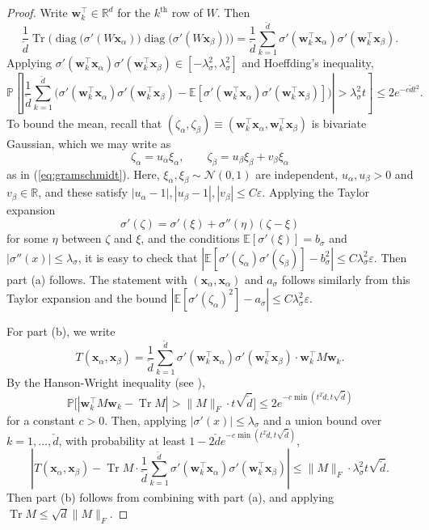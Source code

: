 \documentclass{article}
\theoremstyle{definition}
\newcommand{\R}{\mathbb{R}}
\newcommand{\N}{\mathcal{N}}
\newcommand{\E}{\mathbb{E}}
\newcommand{\Tr}{\operatorname{Tr}}
\newcommand{\x}{\mathbf{x}}
\newcommand{\w}{\mathbf{w}}
\renewcommand{\a}{\alpha}
\renewcommand{\b}{\beta}
\newcommand{\eps}{\varepsilon}
\newcommand{\vd}{\check{d}}
\renewcommand{\P}{\mathbb{P}}
\newcommand{\1}{\mathbf{1}}
\newcommand{\diag}{\operatorname{diag}}
\begin{document}
\begin{proof}
Write $\w_k^\top \in \R^d$ for the $k^\text{th}$ row of $W$. Then
\[\frac{1}{\vd}\Tr \Big(\diag\big(\sigma'(W \x_\a)\big)
\diag\big(\sigma'(W \x_\b)\big)\Big)
=\frac{1}{\vd}\sum_{k=1}^{\vd} \sigma'(\w_k^\top \x_\a)\sigma'(\w_k^\top \x_\b).\]
Applying $\sigma'(\w_k^\top \x_\a)
\sigma'(\w_k^\top \x_\b) \in [-\lambda_\sigma^2,\lambda_\sigma^2]$ and
Hoeffding's inequality,
\[\P\left[\left|\frac{1}{\vd}\sum_{k=1}^{\vd} \Big(\sigma'(\w_k^\top \x_\a)
\sigma'(\w_k^\top \x_\b)-\E[\sigma'(\w_k^\top \x_\a)
\sigma'(\w_k^\top \x_\b)]\Big)\right|>\lambda_\sigma^2 t\right] \leq 2e^{-c\vd
t^2}.\]
To bound the mean, recall that $(\zeta_\a,\zeta_\b) \equiv
(\w_k^\top \x_\a,\w_k^\top\x_\b)$ is bivariate Gaussian, which we may write as
\[\zeta_\a=u_\a \xi_\a, \qquad \zeta_\b=u_\b \xi_\b+v_\b \xi_\a\]
as in (\ref{eq:gramschmidt}). Here, $\xi_\a,\xi_\b \sim \N(0,1)$ are
independent, $u_\a,u_\b>0$ and $v_\b \in \R$, and these satisfy
$|u_\a-1|,|u_\b-1|,|v_\b| \leq C\eps$. Applying the Taylor expansion
\[\sigma'(\zeta)=\sigma'(\xi)+\sigma''(\eta)(\zeta-\xi)\]
for some $\eta$ between $\zeta$ and $\xi$, and the conditions
$\E[\sigma'(\xi)]=b_\sigma$ and $|\sigma''(x)| \leq
\lambda_\sigma$, it is easy to check that
$|\E[\sigma'(\zeta_\a)\sigma'(\zeta_\b)]-b_\sigma^2| \leq
C\lambda_\sigma^2\eps$. Then part (a) follows. The statement
with $(\x_\a,\x_\a)$ and $a_\sigma$ follows similarly from this Taylor expansion
and the bound $|\E[\sigma'(\zeta_\a)^2]-a_\sigma| \leq C\lambda_\sigma^2\eps$.

For part (b), we write
\[T(\x_\a,\x_\b)=\frac{1}{\vd}\sum_{k=1}^{\vd} \sigma'(\w_k^\top \x_\a)
\sigma'(\w_k^\top \x_\b) \cdot \w_k^\top M \w_k.\]
By the Hanson-Wright inequality (see \cite[Theorem 1.1]{rudelson2013hanson}),
\[\P\Big[|\w_k^\top M \w_k-\Tr M|>\|M\|_F \cdot t\sqrt{\vd}\Big]
\leq 2e^{-c\min(t^2\vd,t\sqrt{\vd})}\]
for a constant $c>0$. Then, applying $|\sigma'(x)| \leq \lambda_\sigma$ and a
union bound over $k=1,\ldots,\vd$, with probability at least $1-2\vd
e^{-c\min(t^2\vd,t\sqrt{\vd})}$,
\[\left|T(\x_\a,\x_\b)-\Tr M \cdot
\frac{1}{\vd}\sum_{k=1}^{\vd} \sigma'(\w_k^\top \x_\a)\sigma'(\w_k^\top \x_\b)\right|
\leq \|M\|_F \cdot \lambda_\sigma^2 t\sqrt{\vd}.\]
Then part (b) follows from combining with part (a), and applying $\Tr M \leq
\sqrt{d}\|M\|_F$.
\end{proof}
\end{document}
